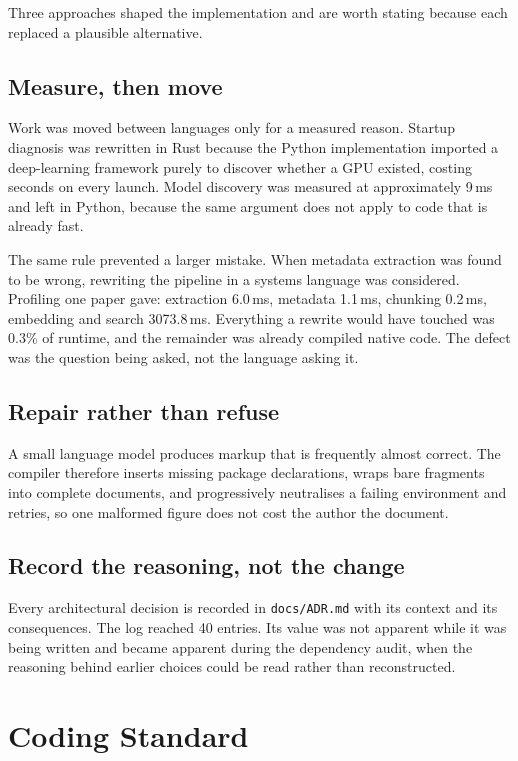 \documentclass[12pt,a4paper]{report}
\begin{document}
Three approaches shaped the implementation and are worth stating because each
replaced a plausible alternative.

\subsection{Measure, then move}

Work was moved between languages only for a measured reason. Startup diagnosis
was rewritten in Rust because the Python implementation imported a deep-learning
framework purely to discover whether a GPU existed, costing seconds on every
launch. Model discovery was measured at approximately 9\,ms and left in Python,
because the same argument does not apply to code that is already fast.

The same rule prevented a larger mistake. When metadata extraction was found to
be wrong, rewriting the pipeline in a systems language was considered. Profiling
one paper gave: extraction 6.0\,ms, metadata 1.1\,ms, chunking 0.2\,ms,
embedding and search 3073.8\,ms. Everything a rewrite would have touched was
0.3\% of runtime, and the remainder was already compiled native code. The defect
was the question being asked, not the language asking it.

\subsection{Repair rather than refuse}

A small language model produces markup that is frequently almost correct. The
compiler therefore inserts missing package declarations, wraps bare fragments
into complete documents, and progressively neutralises a failing environment
and retries, so one malformed figure does not cost the author the document.

\subsection{Record the reasoning, not the change}

Every architectural decision is recorded in \texttt{docs/ADR.md} with its
context and its consequences. The log reached 40 entries. Its value was not
apparent while it was being written and became apparent during the dependency
audit, when the reasoning behind earlier choices could be read rather than
reconstructed.

\section{Coding Standard}
\end{document}
